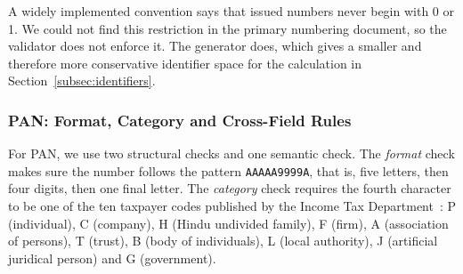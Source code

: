 \documentclass[12pt]{article}
\begin{document}
A widely implemented convention says that issued numbers never begin
with 0 or 1. We could not find this restriction in the primary
numbering document, so the validator does not enforce it. The generator
does, which gives a smaller and therefore more conservative identifier
space for the calculation in Section~\ref{subsec:identifiers}.

\subsubsection{PAN: Format, Category and Cross-Field Rules}
\label{sec:pan-validation}

For PAN, we use two structural checks and one semantic check. The \emph{format} check makes sure the number follows the pattern \texttt{AAAAA9999A}, that is, five letters, then four digits, then one final letter. The \emph{category} check requires
the fourth character to be one of the ten taxpayer codes published by
the Income Tax Department~\cite{itd-pan}: P (individual), C (company),
H (Hindu undivided family), F (firm), A (association of persons),
T (trust), B (body of individuals), L (local authority), J (artificial
juridical person) and G (government).
\end{document}

